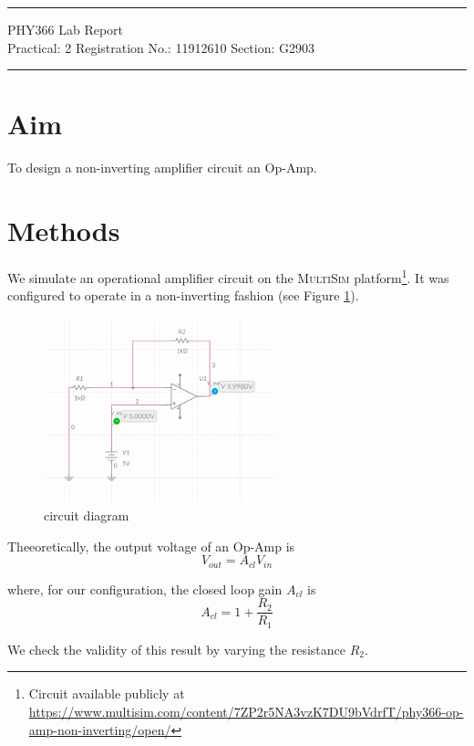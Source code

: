\documentclass{article}
\begin{document}
	
	\author{Aayush Arya}
	\date{(Submitted: \today)}
	\title{}
	
	\maketitle
	
	\hrule
	\begin{center}
		PHY366 Lab Report\\
		Practical: 2 \quad Registration No.: 11912610 \quad Section: G2903
	\end{center}
	\hrule
	
	\section*{Aim}
	To design a non-inverting amplifier circuit an Op-Amp.
	
	\section*{Methods}
	
	We simulate an operational amplifier circuit on the \textsc{MultiSim} platform\footnote{Circuit available publicly at \url{https://www.multisim.com/content/7ZP2r5NA3vzK7DU9bVdrfT/phy366-op-amp-non-inverting/open/}}. It was configured to operate in a non-inverting fashion (see Figure \ref{fig:circuit}).
	\begin{figure}[h!]
		\centering
		\includegraphics[width=0.6\textwidth]{noninv_circuit}
		\caption{circuit diagram}
		\label{fig:circuit}
	\end{figure}
	
	Theeoretically, the output voltage of an Op-Amp is $$ V_{out} = A_{cl}V_{in}$$
	
	where, for our configuration, the closed loop gain $A_{cl}$ is $$ A_{cl} = 1 + \frac{R_2}{R_1}$$
	
	We check the validity of this result by varying the resistance $R_2$.
	
\end{document}
